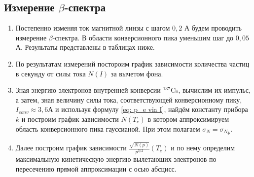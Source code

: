 \documentclass[a4paper,12pt]{article}
\begin{document}
\subsection{Измерение $\beta$-спектра}
\begin{enumerate}
    \item 
    Постепенно изменяя ток магнитной линзы с шагом $0,2$ А будем проводить измерение $\beta$-спектра. В области конверсионного пика уменьшим шаг до $0,05$ А. Результаты представлены в таблицах ниже.
    \item 
    По результатам измерений постороим график зависимости количества частиц в секунду от силы тока $N(I)$ за вычетом фона.
    \item 
    Зная энергию электронов внутренней конверсии ${}^{137}$Cs, вычислим их импульс, а затем, зная величину силы тока, соответствующей конверсионному пику, $I_{conv} \approx 3,6$А и используя формулу \eqref{eq: p_e via I}, найдём константу прибора $k$ и построим график зависимости $N(T_e)$ в котором аппроксимируем область конверсионного пика гауссианой. При этом полагаем $\sigma_N = \sigma_{N_\text{ф}}$.
    \item 
    Далее построим график зависимости $\frac{\sqrt{N(p)}}{p^{3/2}}(T_e)$ и по нему определим максимальную кинетическую энергию вылетающих электронов по пересечению прямой аппроксимации с осью абсцисс. 
    

\end{enumerate}
\end{document}
